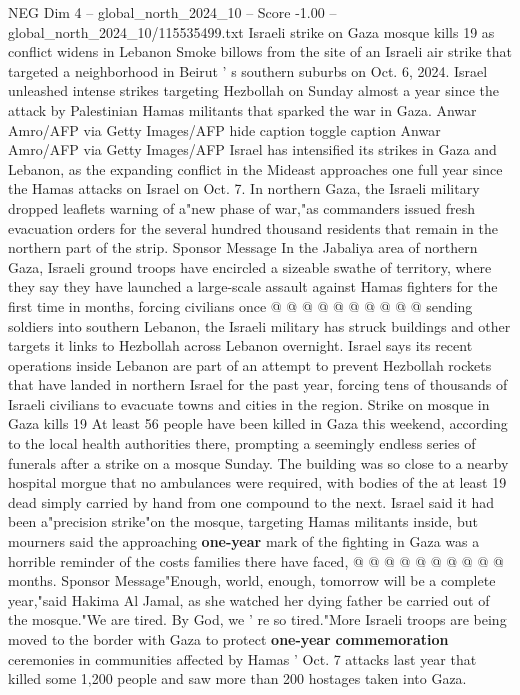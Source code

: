 \begin{textsample}{NEG Dim 4 – global\_north\_2024\_10 – Score -1.00 – global\_north\_2024\_10/115535499.txt}  \label{ex:f4_neg_057}
Israeli strike on Gaza mosque kills 19 as conflict widens in Lebanon Smoke billows from the site of an Israeli air strike that targeted a neighborhood in Beirut ' s southern suburbs on Oct. 6, 2024.
Israel unleashed intense strikes targeting Hezbollah on Sunday almost a year since the attack by Palestinian Hamas militants that sparked the war in Gaza.
Anwar Amro/AFP via Getty Images/AFP hide caption toggle caption Anwar Amro/AFP via Getty Images/AFP Israel has intensified its strikes in Gaza and Lebanon, as the expanding conflict in the Mideast approaches one full year since the Hamas attacks on Israel on Oct. 7.
In northern Gaza, the Israeli military dropped leaflets warning of a"new phase of war,"as commanders issued fresh evacuation orders for the several hundred thousand residents that remain in the northern part of the strip.
Sponsor Message In the Jabaliya area of northern Gaza, Israeli ground troops have encircled a sizeable swathe of territory, where they say they have launched a large-scale assault against Hamas fighters for the first time in months, forcing civilians once @ @ @ @ @ @ @ @ @ @ sending soldiers into southern Lebanon, the Israeli military has struck buildings and other targets it links to Hezbollah across Lebanon overnight.
Israel says its recent operations inside Lebanon are part of an attempt to prevent Hezbollah rockets that have landed in northern Israel for the past year, forcing tens of thousands of Israeli civilians to evacuate towns and cities in the region.
Strike on mosque in Gaza kills 19 At least 56 people have been killed in Gaza this weekend, according to the local health authorities there, prompting a seemingly endless series of funerals after a strike on a mosque Sunday.
The building was so close to a nearby hospital morgue that no ambulances were required, with bodies of the at least 19 dead simply carried by hand from one compound to the next.
Israel said it had been a"precision strike"on the mosque, targeting Hamas militants inside, but mourners said the approaching \textbf{one-year} mark of the fighting in Gaza was a horrible reminder of the costs families there have faced, @ @ @ @ @ @ @ @ @ @ months.
Sponsor Message"Enough, world, enough, tomorrow will be a complete year,"said Hakima Al Jamal, as she watched her dying father be carried out of the mosque."We are tired.
By God, we ' re so tired."More Israeli troops are being moved to the border with Gaza to protect \textbf{one-year} \textbf{commemoration} ceremonies in communities affected by Hamas ' Oct. 7 attacks last year that killed some 1,200 people and saw more than 200 hostages taken into Gaza.

\end{textsample}
